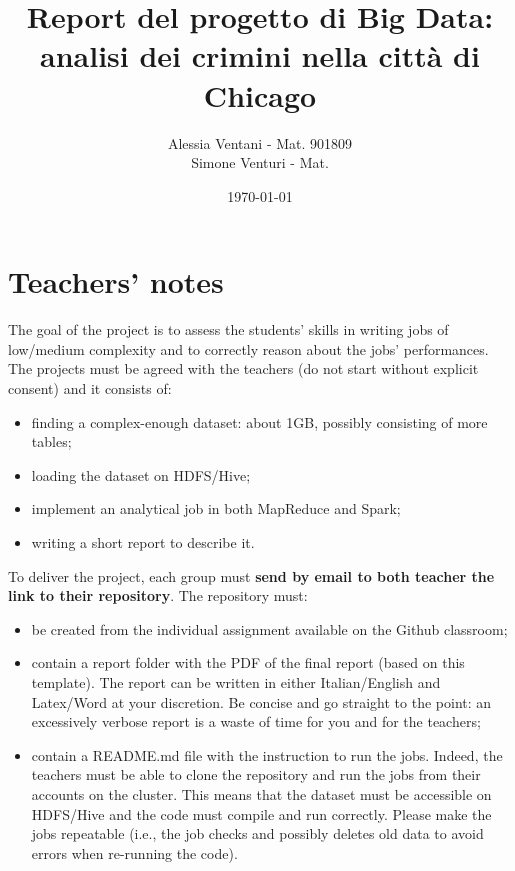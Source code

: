 \documentclass[10pt]{article}
\title{\textbf{Report del progetto di Big Data: \\ analisi dei crimini nella città di Chicago}}
\author{
	Alessia Ventani - Mat. 901809\\
	Simone Venturi - Mat. }
\date{\today}
\begin{document}
\maketitle
\newpage

\tableofcontents

\newpage

\section{Teachers' notes}

The goal of the project is to assess the students' skills in writing jobs of low/medium complexity and to correctly reason about the jobs' performances. The projects must be agreed with the teachers (do not start without explicit consent) and it consists of:

\begin{itemize}
\item finding a complex-enough dataset: about 1GB, possibly consisting of more tables;
\item loading the dataset on HDFS/Hive;
\item implement an analytical job in both MapReduce and Spark;
\item writing a short report to describe it.
\end{itemize}

To deliver the project, each group must {\bf send by email to both teacher the link to their repository}. The repository must:
\begin{itemize}
\item be created from the individual assignment available on the Github classroom;
\item contain a {\sf report} folder with the PDF of the final report (based on this template). The report can be written in either Italian/English and Latex/Word at your discretion. Be concise and go straight to the point: an excessively verbose report is a waste of time for you and for the teachers;
\item contain a {\sf README.md} file with the instruction to run the jobs. Indeed, the teachers must be able to clone the repository and run the jobs from their accounts on the cluster. This means that the dataset must be accessible on HDFS/Hive and the code must compile and run correctly. Please make the jobs repeatable (i.e., the job checks and possibly deletes old data to avoid errors when re-running the code).
\end{itemize}
\end{document}
